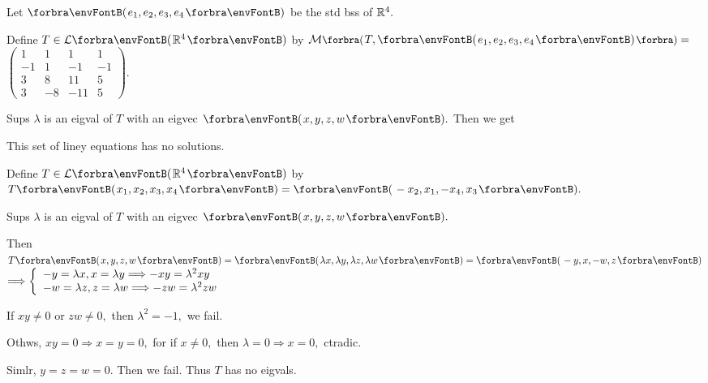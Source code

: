 \par\quad
Let $\Par{e_1,e_2,e_3,e_4}$ be the std bss of $\Rbb^4.$\vspace{-6pt}\par\quad
Define $T\in\Lm{\Rbb^4}$ by $\Mt[\BigPar]{T,\Par{e_1,e_2,e_3,e_4}}={}${\normalsize$\begin{pmatrix}
		1 & 1 & 1 & 1\\
		-1 & 1 & -1 & -1\\
		3 & 8 & 11 & 5\\
		3 & -8 & -11 & 5
	\end{pmatrix}.$}\vspace{-12pt}\par\quad
Sups $\lambda$ is an eigval of $T$ with an eigvec $\Par{x,y,z,w}.$ Then we get \vspace{-8pt}\par\quad
This set of liney equations has no solutions.\par\quad
{}\large\par\vspace{6pt}\quad
\Or Define $T\in\Lm{\Rbb^4}$ by $T\Par{x_1,x_2,x_3,x_4}=\Par{-x_2,x_1,-x_4,x_3}.$\par\quad
Sups $\lambda$ is an eigval of $T$ with an eigvec $\Par{x,y,z,w}.$\vspace{-3pt}\par\quad
Then $T\Par{x,y,z,w}=\Par{\lambda x,\lambda y,\lambda z,\lambda w}=\Par{-y,x,-w,z}$ { $\Longrightarrow\MathLeftBrace{l}{
		-y=\lambda x,x=\lambda y\Longrightarrow-xy=\lambda^2 xy\\
		-w=\lambda z,z=\lambda w\Longrightarrow-zw=\lambda^2 zw}$}\vspace{-3pt}\par\quad
If $xy\neq 0$ or $zw\neq 0,$ then $\lambda^2=-1,$ we fail.\par\quad
Othws, $xy=0\Rightarrow x=y=0,$ for if $x\neq 0,$ then $\lambda=0\Rightarrow x=0,$ ctradic.\par\quad
Simlr, $y=z=w=0.$ Then we fail. Thus $T$ has no eigvals.\PfEnd
\SepLine

